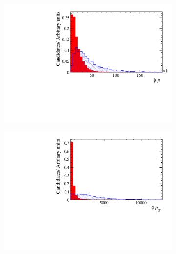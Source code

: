 \begin{figure}[!h]
   \centering
   \begin{subfigure}[t]{0.22\textwidth}
      \centering
      \includegraphics[width=1.0\textwidth]{figs/Selection/Phi_BDT_Var_Ds2KKPi_Phi_P.pdf}
   \end{subfigure}
   \begin{subfigure}[t]{0.22\textwidth}
      \centering
      \includegraphics[width=1.0\textwidth]{figs/Selection/Phi_BDT_Var_Ds2KKPi_Phi_PT.pdf}
   \end{subfigure}
   \begin{subfigure}[t]{0.22\textwidth}
      \centering

\end{subfigure}
\end{figure}
